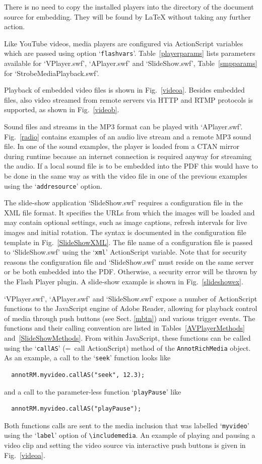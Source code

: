 \documentclass[a4paper]{article}
\begin{document}
There is no need to copy the installed players into the directory of the document source for embedding. They will be found by \LaTeX{} without taking any further action.

Like YouTube videos, media players are configured via ActionScript variables which are passed using option `\verb+flashvars+'. Table~\ref{playerparams} lists parameters available for `VPlayer.swf', `APlayer.swf' and `SlideShow.swf', Table~\ref{smpparams} for `StrobeMediaPlayback.swf'.

Playback of embedded video files is shown in Fig.~\ref{videoa}. Besides embedded files, also video streamed from remote servers via HTTP and RTMP protocols is supported, as shown in Fig.~\ref{videob}.

Sound files and streams in the MP3 format can be played with `APlayer.swf'. Fig.~\ref{radio} contains examples of an audio live stream and a remote MP3 sound file. In one of the sound examples, the player is loaded from a CTAN mirror during runtime because an internet connection is required anyway for streaming the audio. If a local sound file is to be embedded into the PDF this would have to be done in the same way as with the video file in one of the previous examples using the `\verb+addresource+' option.

The slide-show application `SlideShow.swf' requires a configuration file in the XML file format. It specifies the URLs from which the images will be loaded and may contain optional settings, such as image captions, refresh intervals for live images and initial rotation. The syntax is documented in the configuration file template in Fig.~\ref{SlideShowXML}. The file name of a configuration file is passed to `SlideShow.swf' using the `\verb+xml+' ActionScript variable. Note that for security reasons the configuration file and `SlideShow.swf' must reside on the same server or be both embedded into the PDF. Otherwise, a security error will be thrown by the Flash Player plugin. A slide-show example is shown in Fig.~\ref{slideshowex}.

`VPlayer.swf', `APlayer.swf' and `SlideShow.swf' expose a number of ActionScript functions to the JavaScript engine of Adobe Reader, allowing for playback control of media through push buttons (see Sect. \ref{mbtn}) and various trigger events. The functions and their calling convention are listed in Tables~\ref{AVPlayerMethods} and~\ref{SlideShowMethods}. From within JavaScript, these functions can be called using the `\verb+callAS+' (=~call ActionScript) method of the \verb+AnnotRichMedia+ object. As an example, a call to the `\verb+seek+' function looks like
\begin{verbatim}
  annotRM.myvideo.callAS("seek", 12.3);
\end{verbatim}
and a call to the parameter-less function `\verb+playPause+' like
\begin{verbatim}
  annotRM.myvideo.callAS("playPause");
\end{verbatim}
Both functions calls are sent to the media inclusion that was labelled `\verb+myvideo+' using the `\verb+label+' option of \verb+\includemedia+. An example of playing and pausing a video clip and setting the video source via interactive push buttons is given in Fig.~\ref{videoa}.
\end{document}
